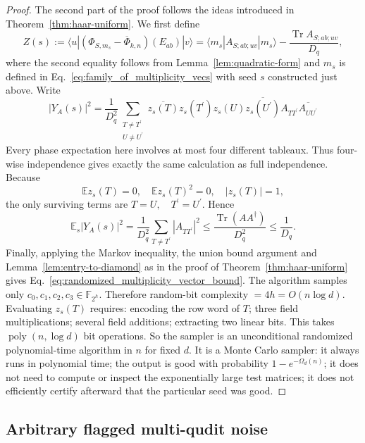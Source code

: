 \documentclass[10pt,twocolumn,superscriptaddress,aps,amsmath,amssymb,citeautoscript,floatfix,prx]{revtex4-2}
\newcounter{alg}
\theoremstyle{plain}
\theoremstyle{plain}
\theoremstyle{plain}
\theoremstyle{plain}
\theoremstyle{plain}
\theoremstyle{plain}
\theoremstyle{plain}
\theoremstyle{definition}
\theoremstyle{plain}
\begin{document}
\begin{appendix}
\begin{proof}
The second part of the proof follows the ideas introduced in Theorem~\ref{thm:haar-uniform}. We first define
\[
Z(s):=\langle u|\left(\Phi_{S, m_s}-\overline{\Phi}_{k,n}\right)\left(E_{a b}\right)|v\rangle=\langle m_s| A_{S ; a b ; u v}|m_s\rangle-\frac{\operatorname{Tr} A_{S ; a b ; u v}}{D_q},
\]
where the second equality follows from Lemma~\ref{lem:quadratic-form} and $m_s$ is defined in Eq.~\eqref{eq:family_of_multiplicity_vecs} with seed $s$ constructed just above. Write
$$
\left|Y_A(s)\right|^2=\frac{1}{D_q^2} \sum_{\substack{T \neq T^{\prime} \\ U \neq U^{\prime}}} \overline{z_s(T)} z_s\left(T^{\prime}\right) z_s(U) \overline{z_s\left(U^{\prime}\right)} A_{T T^{\prime}} \overline{A_{U U^{\prime}}}
$$
Every phase expectation here involves at most four different tableaux. Thus four-wise independence gives exactly the same calculation as full independence.
Because
$$
\mathbb{E} z_s(T)=0, \quad \mathbb{E} z_s(T)^2=0, \quad\left|z_s(T)\right|=1,
$$
the only surviving terms are
$
T=U, \quad T^{\prime}=U^{\prime} .
$
Hence
$$
\mathbb{E}_s\left|Y_A(s)\right|^2=\frac{1}{D_q^2} \sum_{T \neq T^{\prime}}\left|A_{T T^{\prime}}\right|^2\leq \frac{\operatorname{Tr}\left(A A^{\dagger}\right)}{D_q^2}\leq \frac{1}{D_q}.
$$
Finally, applying the Markov inequality, the union bound argument and Lemma~\ref{lem:entry-to-diamond} as in the proof of Theorem~\ref{thm:haar-uniform} gives Eq.~\ref{eq:randomized_multiplicity_vector_bound}.
The algorithm samples only
$
c_0, c_1, c_2, c_3 \in \mathbb{F}_{2^h} .
$
Therefore random-bit complexity $=4 h=O(n \log d)$.
Evaluating $z_s(T)$ requires:
encoding the row word of $T$;
three field multiplications;
several field additions;
extracting two linear bits.
This takes
$
\operatorname{poly}(n, \log d)
$
bit operations.
So the sampler is an unconditional randomized polynomial-time algorithm in $n$ for fixed $d$.
It is a Monte Carlo sampler:
it always runs in polynomial time;
the output is good with probability $1-e^{-\Omega_d(n)}$;
it does not need to compute or inspect the exponentially large test matrices;
it does not efficiently certify afterward that the particular seed was good.
\end{proof}


\subsection{Arbitrary flagged multi-qudit noise}\label{subsec:supple_arb_3_noise}


\end{appendix}
\end{document}
